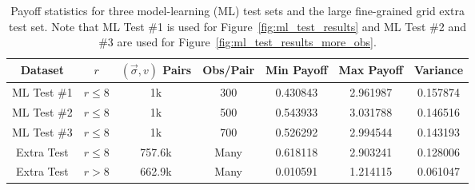 \begin{table}[htb]
\begin{tabular}{c|c|c|c|c|c|c}
Dataset     & $r$        & $(\vec{\sigma}, v)$ Pairs & Obs/Pair & Min Payoff & Max Payoff & Variance \\
\hline 
ML Test \#1 & $r \leq 8$ & 1k                        & 300      & 0.430843   & 2.961987   & 0.157874 \\
ML Test \#2 & $r \leq 8$ & 1k                        & 500      & 0.543933   & 3.031788   & 0.146516 \\
ML Test \#3 & $r \leq 8$ & 1k                        & 700      & 0.526292   & 2.994544   & 0.143193 \\
Extra Test  & $r \leq 8$ & 757.6k                    & Many     & 0.618118   & 2.903241   & 0.128006 \\
Extra Test  & $r > 8$    & 662.9k                    & Many     & 0.010591   & 1.214115   & 0.061047
\end{tabular}
\caption{Payoff statistics for three model-learning (ML) test sets and the large fine-grained grid extra test set. Note that ML Test \#1 is used for Figure~\ref{fig:ml_test_results} and ML Test \#2 and \#3 are used for Figure~\ref{fig:ml_test_results_more_obs}.}
\label{table:game1_test_payoff_stats}
\end{table}